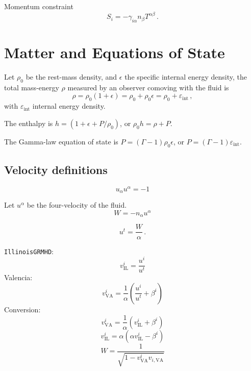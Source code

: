 \documentclass[]{scrartcl}
\begin{document}
Momentum constraint
\begin{equation}
  \label{eq:9}
  S_i = - \gamma_{i\alpha} n_\beta T^{\alpha\beta}\,.
\end{equation}

\section{Matter and Equations of State}
\label{sec:matter}

Let $\rho_0$ be the rest-mass density, and $\epsilon$ the specific internal energy
density, the total mass-energy $\rho$ measured by an observer comoving with the
fluid is
\begin{equation}
  \label{eq:6}
  \rho = \rho_0 (1 + \epsilon) = \rho_0 + \rho_0 \epsilon = \rho_0 + \varepsilon_{\text{int}}\,,
\end{equation}
with $\varepsilon_{\text{int}}$ internal energy density.

The enthalpy is $h = (1 + \epsilon + P\slash \rho_0)$, or $\rho_0 h = \rho + P$.

The Gamma-law equation of state is $P = (\Gamma - 1) \rho_0 \epsilon$, or $P = (\Gamma - 1) \varepsilon_{\text{int}}$.


\subsection{Velocity definitions}
\label{sec:velocity-definitions}

\begin{equation}
  \label{eq:19}
  u_\alpha u^\alpha = -1
\end{equation}

Let $u^\alpha$ be the four-velocity of the fluid.
\begin{equation}
  \label{eq:10}
  W = -n_\alpha u^\alpha
\end{equation}

\begin{equation}
  \label{eq:7}
  u^t = \frac{W}{\alpha}\,.
\end{equation}

\texttt{IllinoisGRMHD}:
\begin{equation}
  \label{eq:13}
  v^i_{\text{IL}} = \frac{u^i}{u^t}
\end{equation}
Valencia:
\begin{equation}
  \label{eq:14}
  v^i_{\text{VA}} = \frac{1}{\alpha} \left( \frac{u^i}{u^t} + \beta^i \right)
\end{equation}
Conversion:
\begin{equation}
  \label{eq:15}
  v^i_{\text{VA}} = \frac{1}{\alpha} \left( v^i_{\text{IL}} + \beta^i \right)
\end{equation}
\begin{equation}
  \label{eq:15}
  v^i_{\text{IL}} = {\alpha} \left( \alpha v^i_{\text{IL}} - \beta^i \right)
\end{equation}
\begin{equation}
  \label{eq:20}
  W = \frac{1}{\sqrt{1 - v^i_{\text{VA}} v_{i,\text{VA}}}}
\end{equation}
\end{document}
